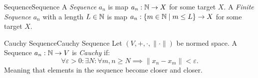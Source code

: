 \documentclass{article}
\begin{document}
\begin{definition}{Sequence}{Sequence}
    A \emph{Sequence} $a_n$ is map $a_n : \mathbb{N} \to X$ for some target $X$.
    A \emph{Finite Sequence} $a_n$ with a length $L \in \mathbb{N}$ is map $a_n : \{m \in \mathbb{N} \mid m \leq L\} \to X$ for some target $X$.
\end{definition}

\begin{definition}{Cauchy Sequence}{Cauchy Sequence}
    Let $\left(V, +, \cdot, \|\cdot\|\right)$ be normed space.
    A Sequence $a_n: \mathbb{N} \to V$ is \emph{Cauchy} if:
    $$\forall \varepsilon > 0 : \exists N : \forall m, n \geq N \implies \|x_n - x_m\| < \varepsilon.$$
    Meaning that elements in the sequence become closer and closer.
\end{definition}
\end{document}
